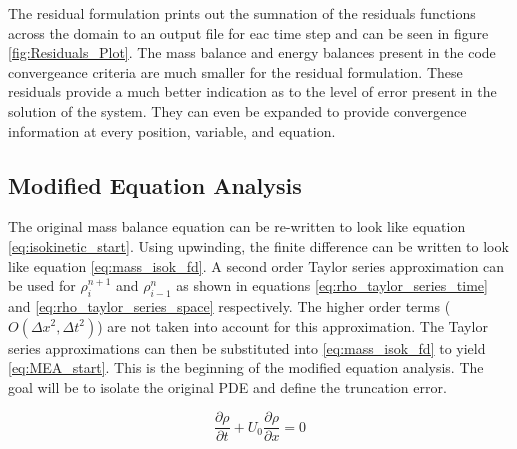 \documentclass{mc2015}
\begin{document}
The residual formulation prints out the sumnation of the residuals functions
across the domain to an output file for eac time step and can be seen in
figure \ref{fig:Residuals_Plot}. The mass balance and energy balances present in
the code convergeance criteria are much smaller for the residual formulation.
These residuals provide a much better indication as to the level of error present in
the solution of the system. They can even be expanded to provide convergence
information at every position, variable, and equation. 



%
%

\subsection{Modified Equation Analysis}
    
    The original mass balance equation can be re-written to 
    look like equation \ref{eq:isokinetic_start}. Using upwinding, the finite difference
    can be written to look like equation \ref{eq:mass_isok_fd}. A second order Taylor 
    series approximation can be used for $\rho_{i}^{n+1}$ and $\rho_{i-1}^{n}$ as shown 
    in equations \ref{eq:rho_taylor_series_time} and \ref{eq:rho_taylor_series_space} 
    respectively. The higher order terms ($O(\Delta x^{2},\Delta t^{2} )$) are
    not taken into account for this approximation. The Taylor series
    approximations can then be substituted into \ref{eq:mass_isok_fd} to yield
    \ref{eq:MEA_start}. This is the beginning of the modified equation analysis.
    The goal will be to isolate the original PDE and define the truncation error.
    
    \begin{equation}
    	\label{eq:isokinetic_start}
    	\frac{\partial \rho}{\partial t} + U_{0} \frac{\partial \rho}{\partial x} = 0
    \end{equation}
    
\end{document}
